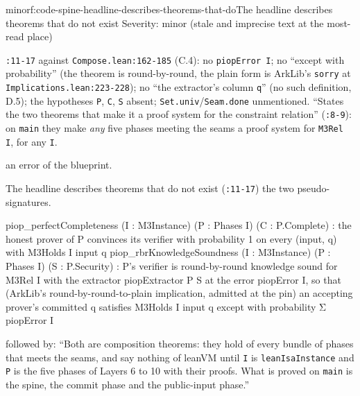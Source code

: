 \begin{finding}{minor}{f:code-spine-headline-describes-theorems-that-do}{The headline describes theorems that do not exist}
Severity: minor (stale and imprecise text at the most-read place)

\texttt{:11-{}17} against \texttt{Compose.\allowbreak{}lean:162-{}185} (C.4): no \texttt{piopError I}; no \enquote{except with probability} (the theorem is round-by-round, the plain form is ArkLib's \texttt{sorry} at \texttt{Implications.\allowbreak{}lean:223-{}228}); no \enquote{the extractor's column \texttt{q}} (no such definition, D.5); the hypotheses \texttt{P}, \texttt{C}, \texttt{S} absent; \texttt{Set.\allowbreak{}univ}/\texttt{Seam.\allowbreak{}done} unmentioned. \enquote{States the two theorems that make it a proof system for the constraint relation} (\texttt{:8-{}9}): on \texttt{main} they make \emph{any} five phases meeting the seams a proof system for \texttt{M3Rel I}, for any \texttt{I}.

an error of the blueprint.

\begin{change}{The headline describes theorems that do not exist}
\asis (\texttt{:11-{}17}) the two pseudo-signatures.
\asproposed \begin{srccode}
piop_perfectCompleteness (I : M3Instance) (P : Phases I) (C : P.Complete) :
  the honest prover of P convinces its verifier with probability 1 on every (input, q)
  with M3Holds I input q
piop_rbrKnowledgeSoundness (I : M3Instance) (P : Phases I) (S : P.Security) :
  P's verifier is round-by-round knowledge sound for M3Rel I with the extractor
  piopExtractor P S at the error piopError I, so that (ArkLib's round-by-round-to-plain
  implication, admitted at the pin) an accepting prover's committed q satisfies
  M3Holds I input q except with probability Σ piopError I
\end{srccode}

followed by: \enquote{Both are composition theorems: they hold of every bundle of phases that meets the seams, and say nothing of leanVM until \texttt{I} is \texttt{leanIsaInstance} and \texttt{P} is the five phases of Layers 6 to 10 with their proofs. What is proved on \texttt{main} is the spine, the commit phase and the public-input phase.}
\end{change}

\end{finding}

